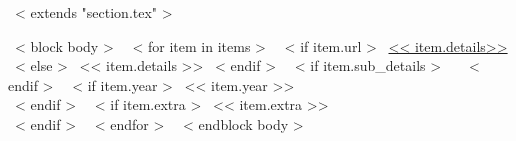 ~< extends "section.tex" >~

~< block body >~
  ~< for item in items >~
    ~< if item.url >~
      \href{<< item.url >>}{<< item.details>>}
    ~< else >~
      << item.details >>
    ~< endif >~
    ~< if item.sub_details >~
      \,\, {\scriptsize
        \color{gray}{<< item.sub_details >>}
      }
    ~< endif >~
    ~< if item.year >~
        \hfill << item.year >> \\
    ~< endif >~
    ~< if item.extra >~
        << item.extra >> \\
    ~< endif >~
  ~< endfor >~
~< endblock body >~
